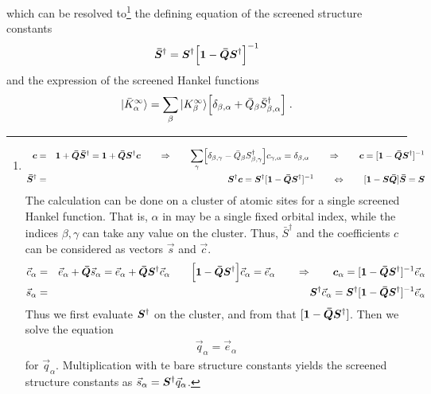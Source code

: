 \documentclass[11pt,a4paper]{report}
\begin{document}
which can be resolved to\footnote{
\begin{eqnarray}
\bm{c}&=&\bm{1}
+\bm{\bar{Q}}\bm{\bar{S}}^\dagger
=\bm{1}+\bm{\bar{Q}}\bm{S}^\dagger\bm{c}
\qquad
\Rightarrow\qquad\sum_\gamma \Bigl[\delta_{\beta,\gamma}
-\bar{Q}_\beta S^\dagger_{\beta,\gamma}\Bigr] c_{\gamma,\alpha}=\delta_{\beta,\alpha}
\qquad\Rightarrow\qquad
\bm{c}=[\bm{1}-\bm{\bar{Q}}\bm{S}^\dagger]^{-1}
\nonumber\\
\bm{\bar{S}}^\dagger&=&\bm{S}^\dagger\bm{c}
=\bm{S}^\dagger[\bm{1}-\bm{\bar{Q}}\bm{S}^\dagger]^{-1}
\qquad\Leftrightarrow\qquad
[\bm{1}-\bm{S}\bm{\bar{Q}}]\bm{\bar{S}}=\bm{S}
\end{eqnarray}
The calculation can be done on a cluster of atomic sites for a single
screened Hankel function. That is, $\alpha$ in
 may be a single fixed orbital index,
while the indices $\beta,\gamma$ can take any value on the
cluster. Thus, $\bar{S}^\dagger$ and the coefficients $c$ can be considered as
vectors $\vec{s}$ and $\vec{c}$.
\begin{eqnarray}
\vec{c}_\alpha&=&\vec{e}_\alpha+\bm{\bar{Q}}\vec{s}_\alpha
=\vec{e}_\alpha+\bm{\bar{Q}}\bm{S}^\dagger\vec{c}_\alpha
\qquad
\Bigl[\bm{1}-\bm{\bar{Q}}\bm{S}^\dagger\Bigr]\vec{c}_\alpha=\vec{e}_\alpha
\qquad\Rightarrow\qquad
\bm{c}_\alpha=[\bm{1}-\bm{\bar{Q}}\bm{S}^\dagger]^{-1}\vec{e}_\alpha
\nonumber\\
\vec{s}_\alpha&=&\bm{S}^\dagger\vec{c}_\alpha
=\bm{S}^\dagger[\bm{1}-\bm{\bar{Q}}\bm{S}^\dagger]^{-1}\vec{e}_\alpha
\end{eqnarray}
Thus we first evaluate $\bm{S}^\dagger$ on the cluster, and from that
$[\bm{1}-\bm{\bar{Q}}\bm{S}^\dagger]$. Then we solve the equation
\begin{eqnarray}
[\mat{1}-\mat{\bar{Q}}\mat{S}^\dagger]\vec{q}_\alpha=\vec{e}_\alpha
\end{eqnarray}
for $\vec{q}_\alpha$.  Multiplication with te bare structure constants
yields the screened structure constants as
$\vec{s}_\alpha=\bm{S}^\dagger\vec{q}_\alpha$.  } the defining
equation of the screened structure constants
\begin{eqnarray}
\bm{\bar{S}}^\dagger=\bm{S}^\dagger
\Bigl[\bm{1}-\bm{\bar{Q}}\bm{S}^\dagger\Bigr]^{-1}
\end{eqnarray}
and the expression of the screened Hankel functions 
\begin{eqnarray}
|\bar{K}^\infty_\alpha\rangle=\sum_\beta |K^\infty_\beta\rangle
\Bigl[\delta_{\beta,\alpha}+
\bar{Q}_\beta \bar{S}^\dagger_{\beta,\alpha}\Bigr]
\;.
\end{eqnarray}
\end{document}
